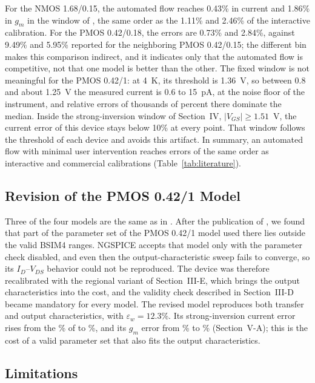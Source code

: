 \documentclass[a4paper,10pt,twoside,twocolumn,final]{JICS_LaTexGuidelines} %
\begin{document}
For the NMOS 1.68/0.15, the automated flow reaches 0.43\% in current and 1.86\% in $g_m$ in the window of \cite{b6}, the same order as the 1.11\% and 2.46\% of the interactive calibration. For the PMOS 0.42/0.18, the errors are 0.73\% and 2.84\%, against 9.49\% and 5.95\% reported for the neighboring PMOS 0.42/0.15; the different bin makes this comparison indirect, and it indicates only that the automated flow is competitive, not that one model is better than the other. The fixed window is not meaningful for the PMOS 0.42/1: at 4~K, its threshold is 1.36~V, so between 0.8 and about 1.25~V the measured current is 0.6 to 15~pA, at the noise floor of the instrument, and relative errors of thousands of percent there dominate the median. Inside the strong-inversion window of Section~IV, $|V_{GS}|\ge1.51$~V, the current error of this device stays below 10\% at every point. That window follows the threshold of each device and avoids this artifact. In summary, an automated flow with minimal user intervention reaches errors of the same order as interactive and commercial calibrations (Table~\ref{tab:literature}).

\subsection{Revision of the PMOS 0.42/1 Model}

Three of the four models are the same as in \cite{b17}. After the publication of \cite{b17}, we found that part of the parameter set of the PMOS 0.42/1 model used there lies outside the valid BSIM4 ranges. NGSPICE accepts that model only with the parameter check disabled, and even then the output-characteristic sweep fails to converge, so its $I_D$--$V_{DS}$ behavior could not be reproduced. The device was therefore recalibrated with the regional variant of Section~III-E, which brings the output characteristics into the cost, and the validity check described in Section~III-D became mandatory for every model. The revised model reproduces both transfer and output characteristics, with $\varepsilon_w=12.3$\%. Its strong-inversion current error rises from the \% of \cite{b17} to \%, and its $g_m$ error from \% to \% (Section~V-A); this is the cost of a valid parameter set that also fits the output characteristics.

\subsection{Limitations}
\end{document}

